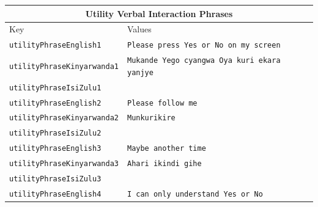 \documentclass{CSSRforAfrica}
\begin{document}
\begin{table}[H]
\begin{center}
\begin{tabular}{|l l l|}
\hline \hline
\multicolumn{3}{|c|}{{\small \bf  Utility Verbal Interaction Phrases}} \\
\hline \hline
 {\small  Key  }                                         &  {\small Values }   &      \\
\hline
{\footnotesize \verb+utilityPhraseEnglish1+}             & {\footnotesize \verb+Please press Yes or No on my screen+}\vspace{-1mm} & {\footnotesize  } \\
{\footnotesize \verb+utilityPhraseKinyarwanda1+}     & {\footnotesize \verb+Mukande Yego cyangwa Oya kuri ekara yanjye+}\vspace{-1mm} & {\footnotesize  } \\
{\footnotesize \verb+utilityPhraseIsiZulu1+}              & {\footnotesize \verb++}\vspace{-1mm} & {\footnotesize  } \\
{\footnotesize \verb+utilityPhraseEnglish2+}             & {\footnotesize \verb+Please follow me+}\vspace{-1mm} & {\footnotesize  } \\
{\footnotesize \verb+utilityPhraseKinyarwanda2+}     & {\footnotesize \verb+Munkurikire+}\vspace{-1mm} & {\footnotesize  } \\
{\footnotesize \verb+utilityPhraseIsiZulu2+}              & {\footnotesize \verb++}\vspace{-1mm} & {\footnotesize  } \\
{\footnotesize \verb+utilityPhraseEnglish3+}             & {\footnotesize \verb+Maybe another time+}\vspace{-1mm} & {\footnotesize  } \\
{\footnotesize \verb+utilityPhraseKinyarwanda3+}     & {\footnotesize \verb+Ahari ikindi gihe+}\vspace{-1mm} & {\footnotesize  } \\
{\footnotesize \verb+utilityPhraseIsiZulu3+}              & {\footnotesize \verb++}\vspace{-1mm} & {\footnotesize  } \\
{\footnotesize \verb+utilityPhraseEnglish4+}             & {\footnotesize \verb+I can only understand Yes or No+}\vspace{-1mm} & {\footnotesize  } \\

\end{tabular}
\end{center}
\end{table}
\end{document}
